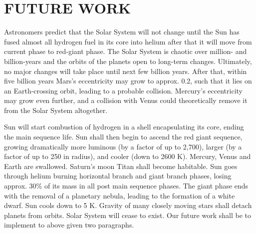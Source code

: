 \documentclass[letterpaper, 10 pt, conference]{ieeeconf}  %
\begin{document}
\section{FUTURE WORK}
Astronomers predict that the Solar System will not change until the Sun has fused almost all hydrogen fuel in its core into helium after that it will move from current phase to red-giant phase. The Solar System is chaotic over million- and billion-years and the orbits of the planets open to long-term changes. Ultimately, no major changes will take place until next few billion years. After that, within five billion years Mars's eccentricity may grow to approx. 0.2, such that it lies on an Earth-crossing orbit, leading to a probable collision. Mercury's eccentricity may grow even further, and a collision with Venus could theoretically remove it from the Solar System altogether.

Sun will start combustion of hydrogen in a shell encapsulating its core, ending the main sequence life. Sun shall then begin to ascend the red giant sequence, growing dramatically more luminous (by a factor of up to 2,700), larger (by a factor of up to 250 in radius), and cooler (down to 2600 K). Mercury, Venus and Earth are swallowed. Saturn's moon Titan shall become habitable. Sun goes through helium burning horizontal branch and giant branch phases, losing approx. 30\% of its mass in all post main sequence phases. The giant phase ends with the removal of a planetary nebula, leading to the formation of a white dwarf. Sun cools down to 5 K. Gravity of many closely moving stars shall detach planets from orbits. Solar System will cease to exist. Our future work shall be to implement to above given two paragraphs.


\addtolength{\textheight}{-12cm}   %




\end{document}
